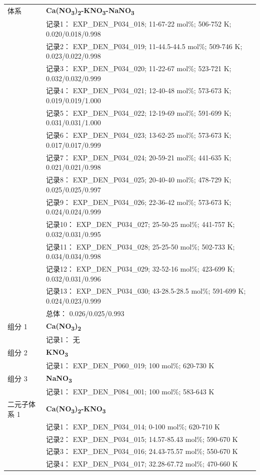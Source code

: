 \documentclass[12pt]{article}
\begin{document}
{\begin{longtable}[]{@{}
  >{\raggedright\arraybackslash}p{}
  >{\raggedright\arraybackslash}p{}@{}}
\midrule
体系 & \textbf{Ca(NO\textsubscript{3})\textsubscript{2}-KNO\textsubscript{3}-NaNO\textsubscript{3}} \\
 & 记录1： EXP\_DEN\_P034\_018; 11-67-22 mol\%; 506-752 K; 0.020/0.018/0.998 \\
 & 记录2： EXP\_DEN\_P034\_019; 11-44.5-44.5 mol\%; 509-746 K; 0.023/0.022/0.998 \\
 & 记录3： EXP\_DEN\_P034\_020; 11-22-67 mol\%; 523-721 K; 0.032/0.032/0.999 \\
 & 记录4： EXP\_DEN\_P034\_021; 12-40-48 mol\%; 573-673 K; 0.019/0.019/1.000 \\
 & 记录5： EXP\_DEN\_P034\_022; 12-19-69 mol\%; 591-699 K; 0.031/0.031/1.000 \\
 & 记录6： EXP\_DEN\_P034\_023; 13-62-25 mol\%; 573-673 K; 0.017/0.017/0.999 \\
 & 记录7： EXP\_DEN\_P034\_024; 20-59-21 mol\%; 441-635 K; 0.021/0.021/0.998 \\
 & 记录8： EXP\_DEN\_P034\_025; 20-40-40 mol\%; 478-729 K; 0.025/0.025/0.997 \\
 & 记录9： EXP\_DEN\_P034\_026; 22-36-42 mol\%; 573-673 K; 0.024/0.024/0.999 \\
 & 记录10： EXP\_DEN\_P034\_027; 25-50-25 mol\%; 441-757 K; 0.032/0.031/0.995 \\
 & 记录11： EXP\_DEN\_P034\_028; 25-25-50 mol\%; 502-733 K; 0.034/0.034/0.998 \\
 & 记录12： EXP\_DEN\_P034\_029; 32-52-16 mol\%; 423-699 K; 0.032/0.031/0.996 \\
 & 记录13： EXP\_DEN\_P034\_030; 43-28.5-28.5 mol\%; 591-699 K; 0.024/0.023/0.999 \\
 & 总体： 0.026/0.025/0.993  \\

组分 1 & \textbf{Ca(NO\textsubscript{3})\textsubscript{2}} \\
 & 记录1： 无 \\
组分 2  & \textbf{KNO\textsubscript{3}} \\
 & 记录1： EXP\_DEN\_P060\_019; 100 mol\%; 620-730 K  \\

组分 3  & \textbf{NaNO\textsubscript{3}} \\
 & 记录1： EXP\_DEN\_P084\_001; 100 mol\%; 583-643 K  \\

二元子体系 1  & \textbf{Ca(NO\textsubscript{3})\textsubscript{2}-KNO\textsubscript{3}} \\
 & 记录1： EXP\_DEN\_P034\_014; 0-100 mol\%; 620-710 K \\
 & 记录2： EXP\_DEN\_P034\_015; 14.57-85.43 mol\%; 590-670 K \\
 & 记录3： EXP\_DEN\_P034\_016; 24.43-75.57 mol\%; 550-670 K \\
 & 记录4： EXP\_DEN\_P034\_017; 32.28-67.72 mol\%; 470-660 K  \\


\end{longtable}}
\end{document}
